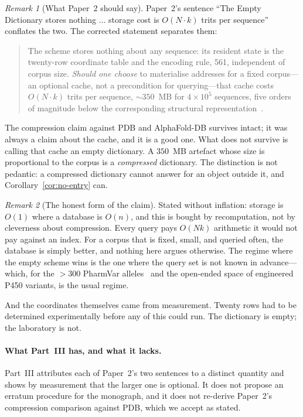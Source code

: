 \documentclass[11pt,twocolumn,a4paper]{article}
\theoremstyle{plain}
\theoremstyle{definition}
\theoremstyle{remark}
\newtheorem{remark}{Remark}
\begin{document}
\begin{remark}[What Paper~2 should say]
\label{rem:p2-fix}
Paper~2's sentence ``The Empty Dictionary stores nothing $\dots$ storage cost
is $O(N \cdot k)$ trits per sequence'' conflates the two. The corrected
statement separates them:

\begin{quote}
\small
The scheme stores nothing about any sequence: its resident state is the
twenty-row coordinate table and the encoding rule, \SI{561}{\byte},
independent of corpus size. \emph{Should one choose} to materialise
addresses for a fixed corpus---an optional cache, not a precondition for
querying---that cache costs $O(N \cdot k)$ trits per sequence,
${\sim}350$~MB for $4 \times 10^{5}$ sequences, five orders of magnitude
below the corresponding structural
representation~\citep{Berman2000,Varadi2022}.
\end{quote}

The compression claim against PDB and AlphaFold-DB survives intact; it was
always a claim about the cache, and it is a good one. What does not survive
is calling that cache an empty dictionary. A $350$~MB artefact whose size is
proportional to the corpus is a \emph{compressed} dictionary. The
distinction is not pedantic: a compressed dictionary cannot answer for an
object outside it, and Corollary~\ref{cor:no-entry} can.
\end{remark}

\begin{remark}[The honest form of the claim]
\label{rem:empty-honest}
Stated without inflation: storage is $O(1)$ where a database is $O(n)$, and
this is bought by recomputation, not by cleverness about compression. Every
query pays $O(Nk)$ arithmetic it would not pay against an index. For a
corpus that is fixed, small, and queried often, the database is simply
better, and nothing here argues otherwise. The regime where the empty scheme
wins is the one where the query set is not known in advance---which, for the
$>300$ PharmVar alleles~\citep{Gaedigk2018} and the open-ended space of
engineered P450 variants, is the usual regime.

And the coordinates themselves came from measurement. Twenty rows had to be
determined experimentally before any of this could run. The dictionary is
empty; the laboratory is not.
\end{remark}

\paragraph{What Part~III has, and what it lacks.}
Part~III attributes each of Paper~2's two sentences to a distinct quantity
and shows by measurement that the larger one is optional. It does not
propose an erratum procedure for the monograph, and it does not re-derive
Paper~2's compression comparison against PDB, which we accept as stated.
\end{document}
